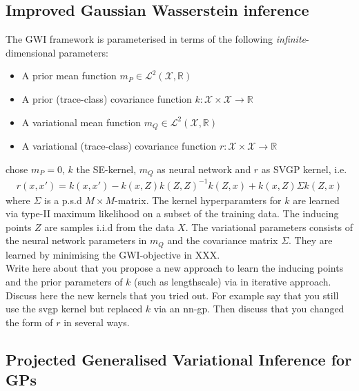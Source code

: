 \documentclass{article}
\newcommand{\bbR}{\mathbb{R}}
\newcommand{\calX}{\mathcal{X}}
\numberwithin{equation}{section}
\begin{document}
\subsection{Improved Gaussian Wasserstein inference }
The GWI framework is parameterised in terms of the following \textit{infinite}-dimensional parameters:
\begin{itemize}
    \item A prior mean function $m_P \in \mathcal{L}^2(\calX, \bbR)$
    \item A prior (trace-class) covariance function $k : \calX \times \calX \to \bbR$
    \item A variational mean function $m_Q \in \mathcal{L}^2(\calX, \bbR)$
    \item A variational (trace-class) covariance function $r: \calX \times \calX \to \bbR$
\end{itemize}
\citet{wild2022generalized} chose $m_P=0$, $k$ the SE-kernel, $m_Q$ as neural network and $r$ as SVGP kernel, i.e.
\begin{align}
    r(x,x') = k(x,x') - k(x,Z) k(Z,Z)^{-1} k(Z,x) + k(x,Z) \Sigma k(Z,x)
\end{align}
where $\Sigma$ is a p.s.d $M \times M$-matrix. The kernel hyperparamters for $k$ are learned via type-II maximum likelihood on a subset of the training data. The inducing points $Z$ are samples i.i.d from the data $X$. The variational parameters consists of the neural network parameters in $m_Q$ and the covariance matrix $\Sigma$. They are learned by minimising the GWI-objective in XXX. \\

Write here about that you propose a new approach to learn the inducing points and the prior parameters of $k$ (such as lengthscale) via in iterative approach. \\

Discuss here the new kernels that you tried out. For example say that you still use the svgp kernel but replaced $k$ via an nn-gp. Then discuss that you changed the form of $r$ in several ways. 

\subsection{Projected Generalised Variational Inference for GPs}
\end{document}
